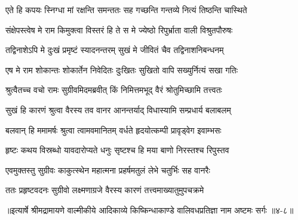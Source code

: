 \twolineshloka
{एते हि कपयः स्निग्धा मां रक्षन्ति समन्ततः}
{सह गच्छन्ति गन्तव्ये नित्यं तिष्ठन्ति चास्थिते} %

\twolineshloka
{संक्षेपस्त्वेष मे राम किमुक्त्वा विस्तरं हि ते}
{स मे ज्येष्ठो रिपुर्भ्राता वाली विश्रुतपौरुषः} %

\twolineshloka
{तद्विनाशेऽपि मे दुःखं प्रमृष्टं स्यादनन्तरम्}
{सुखं मे जीवितं चैव तद्विनाशनिबन्धनम्} %

\twolineshloka
{एष मे राम शोकान्तः शोकार्तेन निवेदितः}
{दुःखितः सुखितो वापि सख्युर्नित्यं सखा गतिः} %

\twolineshloka
{श्रुत्वैतच्च वचो रामः सुग्रीवमिदमब्रवीत्}
{किं निमित्तमभूद् वैरं श्रोतुमिच्छामि तत्त्वतः} %

\twolineshloka
{सुखं हि कारणं श्रुत्वा वैरस्य तव वानर}
{आनन्तर्याद् विधास्यामि सम्प्रधार्य बलाबलम्} %

\twolineshloka
{बलवान् हि ममामर्षः श्रुत्वा त्वामवमानितम्}
{वर्धते हृदयोत्कम्पी प्रावृड्वेग इवाम्भसः} %

\twolineshloka
{हृष्टः कथय विस्रब्धो यावदारोप्यते धनुः}
{सृष्टश्च हि मया बाणो निरस्तश्च रिपुस्तव} %

\twolineshloka
{एवमुक्तस्तु सुग्रीवः काकुत्स्थेन महात्मना}
{प्रहर्षमतुलं लेभे चतुर्भिः सह वानरैः} %

\twolineshloka
{ततः प्रहृष्टवदनः सुग्रीवो लक्ष्मणाग्रजे}
{वैरस्य कारणं तत्त्वमाख्यातुमुपचक्रमे} %


॥इत्यार्षे श्रीमद्रामायणे वाल्मीकीये आदिकाव्ये किष्किन्धाकाण्डे वालिवधप्रतिज्ञा नाम अष्टमः सर्गः ॥४-८॥
